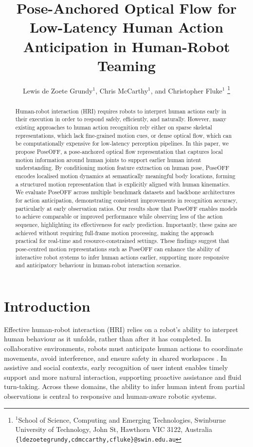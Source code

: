 \documentclass[letterpaper, 10 pt, conference]{ieeeconf}
\title{\LARGE \bf{Pose-Anchored Optical Flow for Low-Latency Human Action Anticipation in Human-Robot Teaming
}}
\author{Lewis de Zoete Grundy$^{1}$, Chris McCarthy$^{1}$, and Christopher Fluke$^{1}$%
\thanks{$^{1}$School of Science, Computing and Emerging Technologies,
        Swinburne University of Technology, John St, Hawthorn VIC 3122, Australia
        {\tt\small\{ldezoetegrundy,cdmccarthy,cfluke\}@swin.edu.au}}%
}
\begin{document}
\maketitle
\thispagestyle{empty}
\pagestyle{empty}

\begin{abstract}
 Human-robot interaction (HRI) requires robots to interpret human actions early in their execution in order to respond safely, efficiently, and naturally. However, many existing approaches to human action recognition rely either on sparse skeletal representations, which lack fine-grained motion cues, or dense optical flow, which can be computationally expensive for low-latency perception pipelines. In this paper, we propose PoseOFF, a pose-anchored optical flow representation that captures local motion information around human joints to support earlier human intent understanding. By conditioning motion feature extraction on human pose, PoseOFF encodes localised motion dynamics at semantically meaningful body locations, forming a structured motion representation that is explicitly aligned with human kinematics. We evaluate PoseOFF across multiple benchmark datasets and backbone architectures for action anticipation, demonstrating consistent improvements in recognition accuracy, particularly at early observation ratios. Our results show that PoseOFF enables models to achieve comparable or improved performance while observing less of the action sequence, highlighting its effectiveness for early prediction. Importantly, these gains are achieved without requiring full-frame motion processing, making the approach practical for real-time and resource-constrained settings. These findings suggest that pose-centred motion representations such as PoseOFF can enhance the ability of interactive robot systems to infer human actions earlier, supporting more responsive and anticipatory behaviour in human-robot interaction scenarios.
\end{abstract}


\section{Introduction}
Effective human-robot interaction (HRI) relies on a robot’s ability to interpret human behaviour as it unfolds, rather than after it has completed. In collaborative environments, robots must anticipate human actions to coordinate movements, avoid interference, and ensure safety in shared workspaces \cite{lasota2017SurveyMethodsSafeHumanRobotInteraction,villani2018SurveyhumanrobotcollaborationindustrialsettingsSafetyintuitiveinterfacesapplications}. In assistive and social contexts, early recognition of user intent enables timely support and more natural interaction, supporting proactive assistance and fluid turn-taking. Across these domains, the ability to infer human intent from partial observations is central to responsive and human-aware robotic systems.
\end{document}
